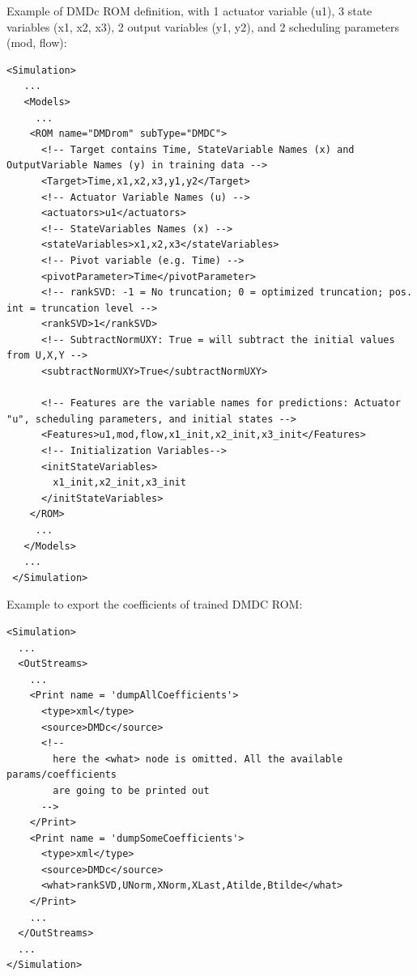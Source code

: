 \hspace{24pt}
Example of DMDc ROM definition, with 1 actuator variable (u1), 3 state variables (x1, x2, x3), 2 output variables (y1, y2), and 2 scheduling parameters (mod, flow):
\begin{lstlisting}[style=XML,morekeywords={name,subType}]
<Simulation>
   ...
   <Models>
     ...
    <ROM name="DMDrom" subType="DMDC">
      <!-- Target contains Time, StateVariable Names (x) and OutputVariable Names (y) in training data -->
      <Target>Time,x1,x2,x3,y1,y2</Target>
      <!-- Actuator Variable Names (u) -->
      <actuators>u1</actuators>
      <!-- StateVariables Names (x) -->
      <stateVariables>x1,x2,x3</stateVariables>
      <!-- Pivot variable (e.g. Time) -->
      <pivotParameter>Time</pivotParameter>
      <!-- rankSVD: -1 = No truncation; 0 = optimized truncation; pos. int = truncation level -->
      <rankSVD>1</rankSVD>
      <!-- SubtractNormUXY: True = will subtract the initial values from U,X,Y -->
      <subtractNormUXY>True</subtractNormUXY>

      <!-- Features are the variable names for predictions: Actuator "u", scheduling parameters, and initial states -->
      <Features>u1,mod,flow,x1_init,x2_init,x3_init</Features>
      <!-- Initialization Variables-->
      <initStateVariables>
        x1_init,x2_init,x3_init
      </initStateVariables>
    </ROM>
     ...
   </Models>
   ...
 </Simulation>

\end{lstlisting}

Example to export the coefficients of trained DMDC ROM:
\begin{lstlisting}[style=XML,morekeywords={name,subType}]
<Simulation>
  ...
  <OutStreams>
    ...
    <Print name = 'dumpAllCoefficients'>
      <type>xml</type>
      <source>DMDc</source>
      <!--
        here the <what> node is omitted. All the available params/coefficients
        are going to be printed out
      -->
    </Print>
    <Print name = 'dumpSomeCoefficients'>
      <type>xml</type>
      <source>DMDc</source>
      <what>rankSVD,UNorm,XNorm,XLast,Atilde,Btilde</what>
    </Print>
    ...
  </OutStreams>
  ...
</Simulation>
\end{lstlisting}


